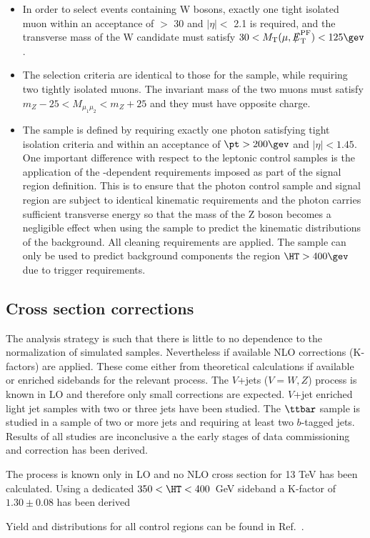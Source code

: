 \begin{itemize}
  \item{\mj} In order to select events containing W bosons, exactly one tight isolated muon within an acceptance of \PT $>$ 30 \gev and $|\eta| <$ 2.1 is required, and the transverse mass of the W candidate must satisfy $30 < \mt(\mu,\pfmet) < 125\gev$. 

  \item{\mmj} The selection criteria are identical to those for the \mj sample, while requiring two tightly isolated muons. The invariant mass of the two muons must satisfy $m_{Z} - 25 < M_{\mu_1\mu_2} < m_{Z} +25$ and they must have opposite charge.


  \item{\gj} The \gj sample is defined by requiring exactly one photon satisfying tight isolation criteria and within an acceptance of $\pt > 200\gev$ and $|\eta| < 1.45$. One important difference with respect to the leptonic control samples is the application of the \HT-dependent \alphat requirements imposed as part of the signal region definition. This is to ensure that the photon control sample and signal region are subject to identical kinematic requirements and the photon carries sufficient transverse energy so that the mass of the Z boson becomes a negligible effect when using the \gj sample to predict the kinematic distributions of the \znunu background. All cleaning requirements are applied. The \gj sample can only be used to predict background components the region $\HT > 400\gev$ due to trigger requirements.


\end{itemize}



\subsection{Cross section corrections}

The analysis strategy is such that there is little to no dependence to the normalization of simulated samples. Nevertheless if available NLO corrections (K-factors) are applied. These come either from theoretical calculations if available or enriched sidebands for the relevant process. 
The $V$+jets ($V=W,Z$) process is known in LO and therefore only small corrections are expected. $V$+jet enriched light jet samples with two or three jets have been studied. The $\ttbar$ sample is studied in a sample of two or more jets and requiring at least two $b$-tagged jets. Results of all studies are inconclusive a the early stages of data commissioning and correction has been derived. 

The \gjets process is known only in LO and no NLO cross section for 13 TeV has been calculated. Using a dedicated $350< \HT<400$~GeV sideband a K-factor of $1.30 \pm 0.08$ has been derived

Yield and distributions for all control regions can be found in Ref.~\cite{alphaTnote}.



